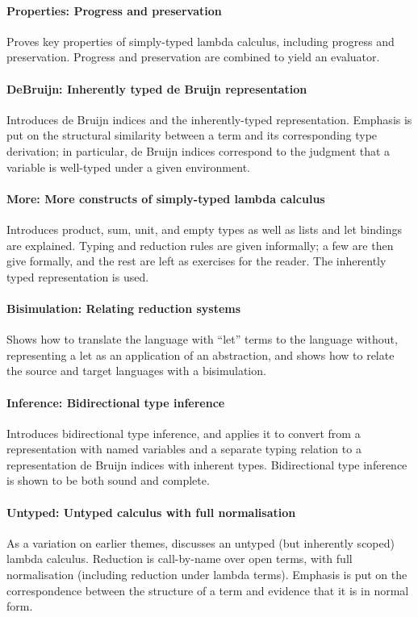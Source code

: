 \documentclass[preprint,authoryear]{elsarticle}
\begin{document}
\paragraph{Properties: Progress and preservation}
Proves key properties of simply-typed
lambda calculus, including progress and preservation.  Progress and
preservation are combined to yield an evaluator.

\paragraph{DeBruijn: Inherently typed de Bruijn representation}
Introduces de Bruijn indices and the inherently-typed representation.
Emphasis is put on the structural similarity between a term and its
corresponding type derivation; in particular, de Bruijn indices
correspond to the judgment that a variable is well-typed under a given
environment.

\paragraph{More: More constructs of simply-typed lambda calculus}
Introduces product, sum, unit, and empty types as well as lists and let bindings
are explained.  Typing and reduction rules are given informally; a few
are then give formally, and the rest are left as exercises for the reader.
The inherently typed representation is used.

\paragraph{Bisimulation: Relating reduction systems}
Shows how to translate the language with ``let'' terms
to the language without, representing a let as an application of an abstraction,
and shows how to relate the source and target languages with a bisimulation.

\paragraph{Inference: Bidirectional type inference}
Introduces bidirectional type inference, and applies it to convert from
a representation with named variables and a separate typing relation
to a representation de Bruijn indices with inherent types. Bidirectional
type inference is shown to be both sound and complete.

\paragraph{Untyped: Untyped calculus with full normalisation}
As a variation on earlier themes, discusses an untyped (but inherently
scoped) lambda calculus.  Reduction is call-by-name over open terms,
with full normalisation (including reduction under lambda terms).  Emphasis
is put on the correspondence between the structure of a term and
evidence that it is in normal form.
\end{document}
